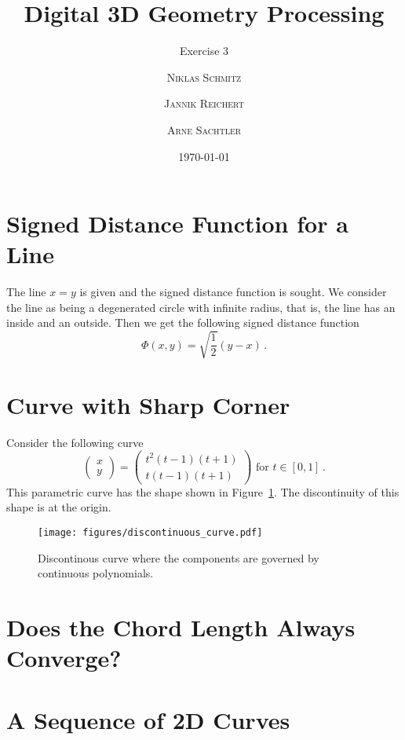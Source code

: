 \documentclass{scrartcl}
\title{Digital 3D Geometry Processing}
\subtitle{Exercise 3}
\author{\textsc{Niklas Schmitz} \and \textsc{Jannik Reichert} \and \textsc{Arne Sachtler}}
\date{\today}
\begin{document}
\maketitle

\section{Signed Distance Function for a Line}
The line $x = y$ is given and the signed distance function is sought.
We consider the line as being a degenerated circle with infinite radius, that is, the line has an inside and an outside.
Then we get the following signed distance function
\begin{equation}
	\Phi (x,y) = \sqrt{\frac{1}{2}} (y - x) \, .
\end{equation}

\section{Curve with Sharp Corner}

Consider the following curve
\begin{equation}
	\begin{pmatrix}x\\y\end{pmatrix} = \begin{pmatrix}t^2 (t-1) (t+1)\\t (t-1) (t+1)\end{pmatrix} \text{ for } t \in [0, 1]\, .
\end{equation}
This parametric curve has the shape shown in Figure~\ref{fig:disc}. The discontinuity of this shape is at the origin.
\begin{figure}[h]
	\centering
	\texttt{[image: figures/discontinuous\_curve.pdf]}
	\caption{Discontinous curve where the components are governed by continuous polynomials.}
	\label{fig:disc}
\end{figure}



\section{Does the Chord Length Always Converge?}

\section{A Sequence of 2D Curves}
	
\end{document}
